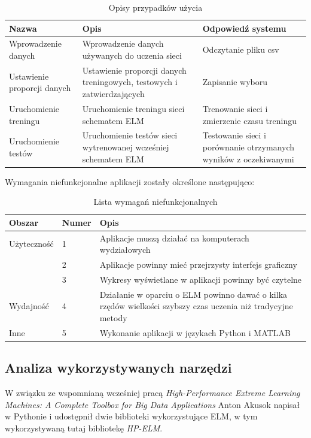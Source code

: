 \documentclass{article}
\begin{document}
\begin{table}[H]
\caption{Opisy przypadków użycia}
\begin{tabular}{|p{3.4cm}|p{5cm}|p{4cm}|}
\hline
\textbf{Nazwa} & \textbf{Opis} & \textbf{Odpowiedź systemu} \\
\hline
Wprowadzenie danych & Wprowadzenie danych używanych do uczenia sieci & Odczytanie pliku csv \\ \hline
Ustawienie proporcji danych & Ustawienie proporcji danych treningowych, testowych i zatwierdzających & Zapisanie wyboru \\ \hline
Uruchomienie treningu & Uruchomienie treningu sieci schematem ELM & Trenowanie sieci i zmierzenie czasu treningu \\ \hline
Uruchomienie testów & Uruchomienie testów sieci wytrenowanej wcześniej schematem ELM & Testowanie sieci i porównanie otrzymanych wyników z oczekiwanymi \\
\hline
\end{tabular}
\end{table}

Wymagania niefunkcjonalne aplikacji zostały określone następująco:
\begin{table}[H]
\caption{Lista wymagań niefunkcjonalnych}
\begin{tabular}{|l|l|p{9.4cm}|}
\hline
\textbf{Obszar} & \textbf{Numer} & \textbf{Opis} \\
\hline
Użyteczność & 1 & Aplikacje muszą działać na komputerach wydziałowych \\
 & 2 & Aplikacje powinny mieć przejrzysty interfejs graficzny \\
 & 3 & Wykresy wyświetlane w aplikacji powinny być czytelne \\
\hline
Wydajność & 4 & Działanie w oparciu o ELM powinno dawać o kilka rzędów wielkości szybszy czas uczenia niż tradycyjne metody \\
\hline 
Inne & 5 & Wykonanie aplikacji w językach Python i MATLAB \\
\hline
\end{tabular}
\end{table}
\subsection{Analiza wykorzystywanych narzędzi}
W związku ze wspomnianą wcześniej pracą \textit{High-Performance Extreme Learning Machines: A Complete Toolbox for Big Data Applications} Anton Akusok napisał w Pythonie i udostępnił dwie biblioteki wykorzystujące ELM, w tym wykorzystywaną tutaj bibliotekę \textit{HP-ELM}.
\end{document}
